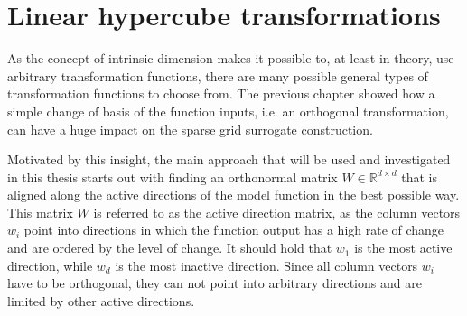 \documentclass[
  a4paper,  %
  twoside,  %
  bibliography=totoc,
  headsepline,
  cleardoublepage=empty,
  parskip=half,
  draft=false
]{scrbook}
\begin{document}
\newpage
\begin{mdframed}[style=style]

\vspace{2.5mm}
\begin{figure}[H]

\centering
{}

\vspace{2.5mm}
\delimit
{}
\label{fig:dim_ranges}
\end{figure}
\end{mdframed}

\section{Linear hypercube transformations}

As the concept of intrinsic dimension makes it possible to, at least in theory, use arbitrary transformation functions, there are many possible general types of transformation functions to choose from.
The previous chapter showed how a simple change of basis of the function inputs, i.e. an orthogonal transformation, can have a huge impact on the sparse grid surrogate construction.

Motivated by this insight, the main approach that will be used and investigated in this thesis starts out with finding an orthonormal matrix $W \in \mathds{R}^{d \times d}$ that is aligned along the active directions of the model function in the best possible way.
This matrix $W$ is referred to as the active direction matrix, as the column vectors $w_i$ point into directions in which the function output has a high rate of change and are ordered by the level of change.
It should hold that $w_1$ is the most active direction, while $w_d$ is the most inactive direction.
Since all column vectors $w_i$ have to be orthogonal, they can not point into arbitrary directions and are limited by other active directions.
\end{document}
